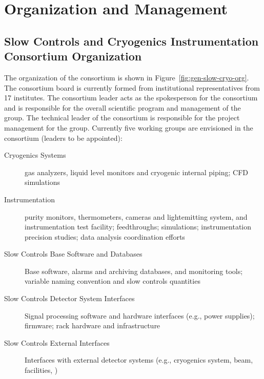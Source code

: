 \section{Organization and Management}
\label{sec:fdgen-slow-cryo-org}

\subsection{Slow Controls and Cryogenics Instrumentation Consortium Organization}
\label{sec:fdgen-slow-cryo-org-consortium}


The organization of the  consortium is shown in
Figure~\ref{fig:gen-slow-cryo-org}. The  consortium board is
currently formed from institutional representatives from \num{17} institutes. 
The consortium leader
acts as the spokesperson for the consortium and is responsible for the
overall scientific program and management of the group. The technical
leader of the consortium is responsible for the project management for
the group.  Currently five working groups are envisioned in the
consortium (leaders to be appointed):







\begin{description}
 \item[Cryogenics Systems] gas analyzers, liquid level
  monitors and cryogenic internal piping; CFD simulations
 \item[\lar Instrumentation] purity monitors, thermometers,
   cameras and lightemitting system, and instrumentation test facility;
   feedthroughs; \efield simulations;
   instrumentation precision studies;
    data analysis coordination efforts
 \item [Slow Controls Base Software and Databases]  Base software, alarms and archiving databases, and monitoring tools;
   variable naming convention and slow controls quantities
 \item [Slow Controls Detector System Interfaces] Signal processing software and hardware interfaces (e.g., power supplies);
   firmware; rack hardware and infrastructure   
 \item [Slow Controls External Interfaces] Interfaces with external detector systems (e.g., cryogenics system, beam, facilities, )
\end{description}

